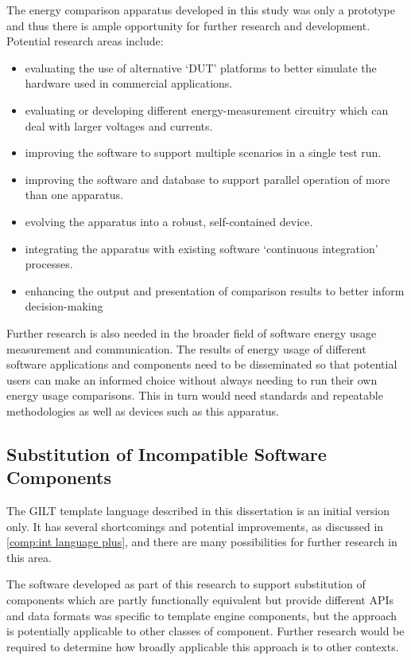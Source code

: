 The energy comparison apparatus developed in this study was only a prototype and thus there is ample opportunity for further research and development. Potential research areas include:

\begin{itemize}
    \item evaluating the use of alternative `DUT' platforms to better simulate the hardware used in commercial applications.
    \item evaluating or developing different energy-measurement circuitry which can deal with larger voltages and currents.
    \item improving the software to support multiple scenarios in a single test run.
    \item improving the software and database to support parallel operation of more than one apparatus.
    \item evolving the apparatus into a robust, self-contained device.
    \item integrating the apparatus with existing software `continuous integration' processes.
    \item enhancing the output and presentation of comparison results to better inform decision-making
\end{itemize}

Further research is also needed in the broader field of software energy usage measurement and communication. The results of energy usage of different software applications and components need to be disseminated so that potential users can make an informed choice without always needing to run their own energy usage comparisons. This in turn would need standards and repeatable methodologies as well as devices such as this apparatus.

\subsection{Substitution of Incompatible Software Components}

The GILT template language described in this dissertation is an initial version only. It has several shortcomings and potential improvements, as discussed in \autoref{comp:int language plus}, and there are many possibilities for further research in this area.

The software developed as part of this research to support substitution of components which are partly functionally equivalent but provide different APIs and data formats was specific to template engine components, but the approach is potentially applicable to other classes of component. Further research would be required to determine how broadly applicable this approach is to other contexts.

